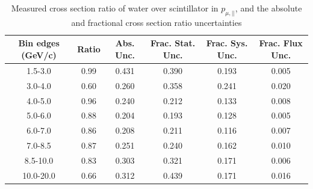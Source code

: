 \documentclass[../main.tex]{subfiles}
\begin{document}
\begin{table}
  \centering
  \renewcommand{\arraystretch}{1.15}
  \caption{Measured cross section ratio of water over scintillator in $p_{\mu,||}$, and the absolute and fractional cross section ratio uncertainties}
    \begin{tabular}{c||c|c||c|c|c}
      Bin edges (GeV/c) &  Ratio  &  Abs. Unc.  &  Frac. Stat. Unc.  &  Frac. Sys. Unc.  &  Frac. Flux Unc. \\
      \hline
      \hline
      1.5-3.0 & 0.99 & 0.431 & 0.390 & 0.193 & 0.005\\
      3.0-4.0 & 0.60 & 0.260 & 0.358 & 0.241 & 0.020\\
      4.0-5.0 & 0.96 & 0.240 & 0.212 & 0.133 & 0.008\\
      5.0-6.0 & 0.88 & 0.204 & 0.193 & 0.128 & 0.005\\
      6.0-7.0 & 0.86 & 0.208 & 0.211 & 0.116 & 0.007\\
      7.0-8.5 & 0.87 & 0.251 & 0.240 & 0.162 & 0.010\\
      8.5-10.0 & 0.83 & 0.303 & 0.321 & 0.171 & 0.006\\
      10.0-20.0 & 0.66 & 0.312 & 0.439 & 0.171 & 0.016
    \end{tabular}
  \label{tbl:rationucleonnuc10muon_pza}
\end{table}
\begin{table}
  \centering
  \renewcommand{\arraystretch}{1.15}
  \caption{Statistical covariance matrix of measured cross section ratio of water over scintillator in $p_{\mu,||}$}
  \label{tbl:rationucleonnuc10muon_pzb}
\end{table}
\end{document}
